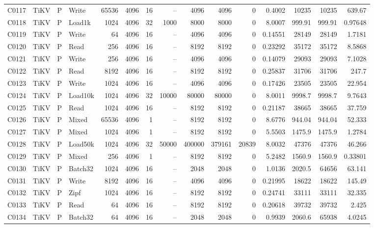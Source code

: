 \begin{landscape}
\begin{longtable}{llllrrrrrrrrrrr}
C0117 & TiKV & P & Write & 65536 & 4096 & 16 & -- & 4096 & 4096 & 0 & 0.4002 & 10235 & 10235 & 639.67\\
C0118 & TiKV & P & Load1k & 1024 & 4096 & 32 & 1000 & 8000 & 8000 & 0 & 8.0007 & 999.91 & 999.91 & 0.97648\\
C0119 & TiKV & P & Write & 64 & 4096 & 16 & -- & 4096 & 4096 & 0 & 0.14551 & 28149 & 28149 & 1.7181\\
C0120 & TiKV & P & Read & 256 & 4096 & 16 & -- & 8192 & 8192 & 0 & 0.23292 & 35172 & 35172 & 8.5868\\
C0121 & TiKV & P & Write & 256 & 4096 & 16 & -- & 4096 & 4096 & 0 & 0.14079 & 29093 & 29093 & 7.1028\\
C0122 & TiKV & P & Read & 8192 & 4096 & 16 & -- & 8192 & 8192 & 0 & 0.25837 & 31706 & 31706 & 247.7\\
C0123 & TiKV & P & Write & 1024 & 4096 & 16 & -- & 4096 & 4096 & 0 & 0.17426 & 23505 & 23505 & 22.954\\
C0124 & TiKV & P & Load10k & 1024 & 4096 & 32 & 10000 & 80000 & 80000 & 0 & 8.0011 & 9998.7 & 9998.7 & 9.7643\\
C0125 & TiKV & P & Read & 1024 & 4096 & 16 & -- & 8192 & 8192 & 0 & 0.21187 & 38665 & 38665 & 37.759\\
C0126 & TiKV & P & Mixed & 65536 & 4096 & 1 & -- & 8192 & 8192 & 0 & 8.6776 & 944.04 & 944.04 & 52.333\\
C0127 & TiKV & P & Mixed & 1024 & 4096 & 1 & -- & 8192 & 8192 & 0 & 5.5503 & 1475.9 & 1475.9 & 1.2784\\
C0128 & TiKV & P & Load50k & 1024 & 4096 & 32 & 50000 & 400000 & 379161 & 20839 & 8.0032 & 47376 & 47376 & 46.266\\
C0129 & TiKV & P & Mixed & 256 & 4096 & 1 & -- & 8192 & 8192 & 0 & 5.2482 & 1560.9 & 1560.9 & 0.33801\\
C0130 & TiKV & P & Batch32 & 1024 & 4096 & 16 & -- & 2048 & 2048 & 0 & 1.0136 & 2020.5 & 64656 & 63.141\\
C0131 & TiKV & P & Write & 8192 & 4096 & 16 & -- & 4096 & 4096 & 0 & 0.21995 & 18622 & 18622 & 145.49\\
C0132 & TiKV & P & Zipf & 1024 & 4096 & 16 & -- & 8192 & 8192 & 0 & 0.24741 & 33111 & 33111 & 32.335\\
C0133 & TiKV & P & Read & 64 & 4096 & 16 & -- & 8192 & 8192 & 0 & 0.20618 & 39732 & 39732 & 2.425\\
C0134 & TiKV & P & Batch32 & 64 & 4096 & 16 & -- & 2048 & 2048 & 0 & 0.9939 & 2060.6 & 65938 & 4.0245\\

\end{longtable}
\end{landscape}
